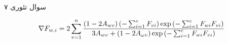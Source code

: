 سوال تئوری ۷

$$
\nabla F_{w,i}=\\ 
2\sum ^{n}_{v=1}\dfrac{\left( 1-2A_{wv}\right) \left( -\sum ^{c}_{i=1}F_{vi}\right) \exp \left( -\sum ^{c}_{i=1}F_{wi}F_{vi}\right) }{3A_{wv}+\left( 1-2A_{\omega v}\right) \exp \left( -\sum ^{c}_{i=1}F_{wi}F_{vi}\right) }
$$